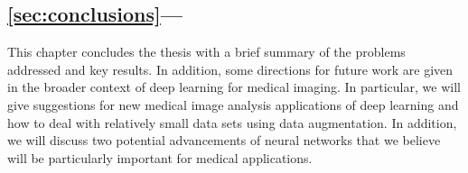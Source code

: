 \subsection*{\ref{sec:conclusions}---}

This chapter concludes the thesis with a brief summary of the problems addressed
and key results. In addition, some directions for future work are given in the
broader context of deep learning for medical imaging. In particular, we will
give suggestions for new medical image analysis applications of deep learning
and how to deal with relatively small data sets using data augmentation. In
addition, we will discuss two potential advancements of neural networks that we
believe will be particularly important for medical applications.


